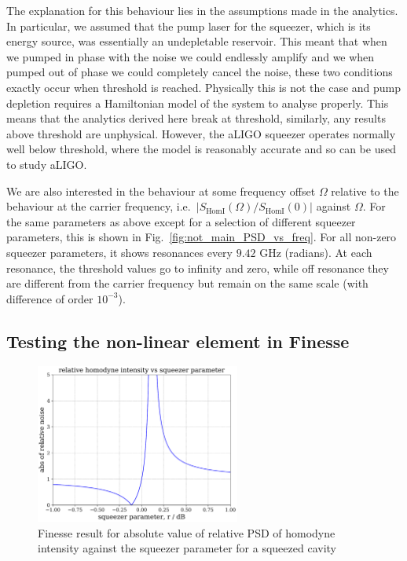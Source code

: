 \documentclass[aps,pra,superscriptaddress,reprint,nofootinbib]{revtex4-1}
\newcommand{\abs}[1]{\left\lvert #1 \right\rvert}
\begin{document}
The explanation for this behaviour lies in the assumptions made in the analytics. In particular, we assumed that the pump laser for the squeezer, which is its energy source, was essentially an undepletable reservoir. This meant that when we pumped in phase with the noise we could endlessly amplify and we when pumped out of phase we could completely cancel the noise, these two conditions exactly occur when threshold is reached. Physically this is not the case and pump depletion requires a Hamiltonian model of the system to analyse properly. This means that the analytics derived here break at threshold, similarly, any results above threshold are unphysical.
However, the aLIGO squeezer operates normally well below threshold, where the model is reasonably accurate and so can be used to study aLIGO.


We are also interested in the behaviour at some frequency offset $\Omega$ relative to the behaviour at the carrier frequency, i.e.\ $\abs{S_{\mathrm{HomI}}(\Omega)/S_{\mathrm{HomI}}(0)}$ against $\Omega$. For the same parameters as above except for a selection of different squeezer parameters, this is shown in Fig.~\ref{fig:not_main_PSD_vs_freq}. For all non-zero squeezer parameters, it shows resonances every $9.42$ GHz (radians). At each resonance, the threshold values go to infinity and zero, while off resonance they are different from the carrier frequency but remain on the same scale (with difference of order $10^{-3}$).


\subsection{Testing the non-linear element in Finesse}

\begin{figure}
	\begin{center}
	\includegraphics[width=0.6\textwidth]{figures/pykat_relative_qhd_vs_r.pdf}
	\end{center}
	\caption{Finesse result for absolute value of relative PSD of homodyne intensity against the squeezer parameter for a squeezed cavity}
	\label{fig:pykat_relative_qhd_vs_r}
\end{figure}
\end{document}
